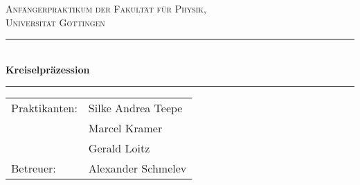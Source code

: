 \begin{titlepage}
\centering
\textsc{\Large Anfängerpraktikum der Fakultät für
  Physik,\\[1.5ex] Universität Göttingen}

\vspace*{4.2cm}

\rule{\textwidth}{1pt}\\[0.5cm]
{\huge \bfseries
  Kreiselpräzession}\\[0.5cm]
\rule{\textwidth}{1pt}

\vspace*{3.5cm}

\begin{Large}
\begin{tabular}{ll}
Praktikanten: &  Silke Andrea Teepe\\
& Marcel Kramer\\
& Gerald Loitz\\
Betreuer: & Alexander Schmelev\\
\end{tabular}
\end{Large}

\vspace*{0.8cm}

\begin{Large}
\end{Large}

\end{titlepage}